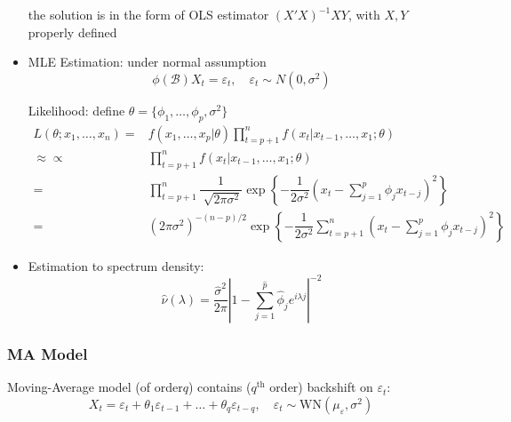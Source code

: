 \begin{itemize}[topsep=2pt,itemsep=0pt]
        the solution is in the form of OLS estimator $ (X'X)^{-1}XY $, with $ X,Y $ properly defined
        
        \item MLE Estimation: under normal assumption
        \begin{equation}
            \phi (\mathscr{B} )X_t=\varepsilon _t,\quad \varepsilon _t\sim N(0,\sigma ^2) 
        \end{equation}

        Likelihood: define $ \theta =\{\phi _1,\ldots,\phi _p,\sigma ^2\} $
        \begin{align*}
            L(\theta ; x_1,\ldots ,x_n)=&f(x_1,\ldots,x_p|\theta )\prod_{t=p+1}^nf(x_t|x_{t-1},\ldots,x_{1};\theta )\\
            \approx \propto &\prod_{t=p+1}^nf(x_t|x_{t-1},\ldots,x_{1};\theta )\\
            =&\prod_{t=p+1}^n \dfrac{1}{\sqrt[]{2\pi \sigma ^2}}\exp\left\{ -\dfrac{1}{2\sigma ^2}(x_t-\sum_{j=1}^p \phi _jx_{t-j})^2 \right\}\\
            =&(2\pi\sigma ^2)^{-(n-p)/2}\exp\left\{ -\dfrac{1}{2\sigma ^2}\sum_{t=p+1}^n (x_t-\sum_{j=1}^p \phi _jx_{t-j})^2\right\}
        \end{align*}
        
        \item Estimation to spectrum density:
        \begin{equation}
            \hat{\nu }(\lambda )=\dfrac{\hat{\sigma }^2}{2\pi}\left\vert 1-\sum_{j=1}^{\hat{p}}\hat{\phi }_je^{i\lambda j} \right\vert^{-2} 
        \end{equation}
        
    \end{itemize}
    
        


\subsubsection{MA Model}

    Moving-Average model (of order$ q $) contains ($ q^\mathrm{th}  $ order) backshift on $ \varepsilon _t $:
    \begin{equation}
        X_t=\varepsilon _t+\theta _1\varepsilon _{t-1}+\ldots +\theta _q\varepsilon _{t-q},\quad \varepsilon _t\sim \mathrm{WN}(\mu_\varepsilon  ,\sigma ^2) 
    \end{equation}

